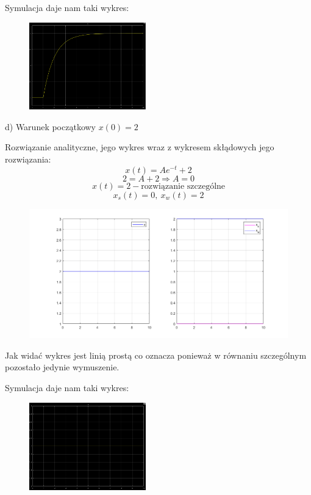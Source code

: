 \documentclass{article}
\begin{document}
\newpage 

Symulacja daje nam taki wykres:\\
\begin{figure}[h!]
    \centering
    \includegraphics[width=0.45\textwidth]{x_0_sym.png}
    \label{fig:my_label}
\end{figure}

\begin{flushleft}
d) Warunek początkowy $x(0)=2$\\
\end{flushleft}
Rozwiązanie analityczne, jego wykres wraz z wykresem skłądowych jego rozwiązania:\\
$$
x(t)=Ae^{-t}+2
$$
$$
2=A+2 \Rightarrow A=0
$$
$$
x(t)=2-\text{rozwiązanie szczególne}
$$
$$
x_s(t)=0, \  x_w(t)=2
$$

\begin{figure}[h!]
    \centering
    \includegraphics[width=\textwidth]{x_2.png}
    \label{fig:my_label}
\end{figure}
Jak widać wykres jest linią prostą co oznacza ponieważ w równaniu szczególnym pozostało jedynie wymuszenie.

\newpage

Symulacja daje nam taki wykres:\\
\begin{figure}[h!]
    \centering
    \includegraphics[width=0.45\textwidth]{x_2_sym.png}
    \label{fig:my_label}
\end{figure}
\end{document}

